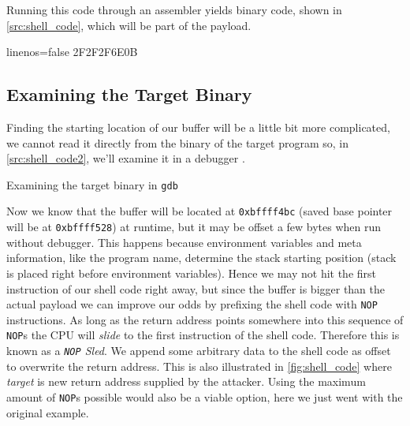 \documentclass[article]{uibk}
\begin{document}
Running this code through an assembler yields binary code, shown in
\cref{src:shell_code}, which will be part of the payload.

\begin{code*}{linenos=false}
    \x2F\x2F\x2F\x6E\x0B\xCD{}
\end{code*}

\subsection{Examining the Target Binary}

Finding the starting location of our buffer will be a little bit more
complicated, we cannot read it directly from the binary of the target program
so, in \cref{src:shell_code2}, we'll examine it in a debugger .

\begin{listing}[h!]
    \begin{minipage}[t]{0.4\textwidth}
    \end{minipage}\hfill
    \begin{minipage}[t]{0.5\textwidth}
    \end{minipage}
    \caption{Examining the target binary in \texttt{gdb}}
    \label{src:shell_code2}
\end{listing}

Now we know that the buffer will be located at \texttt{0xbffff4bc} (saved base
pointer will be at \texttt{0xbffff528}) at runtime, but it may be offset a few
bytes when run without debugger. This happens because environment variables and
meta information, like the program name, determine the stack starting position
(stack is placed right before environment variables). Hence we may not hit the
first instruction of our shell code right away, but since the buffer is bigger
than the actual payload we can improve our odds by prefixing the shell code
with \texttt{NOP} instructions. As long as the return address points somewhere
into this sequence of \texttt{NOP}s the CPU will \emph{slide} to the first
instruction of the shell code. Therefore this is known as a
\textit{\texttt{NOP} Sled}. We append some arbitrary data to the shell code as
offset to overwrite the return address. This is also illustrated in
\cref{fig:shell_code} where \textit{target} is new return address supplied by
the attacker. Using the maximum amount of \texttt{NOP}s possible would also be
a viable option, here we just went with the original example.
\end{document}

